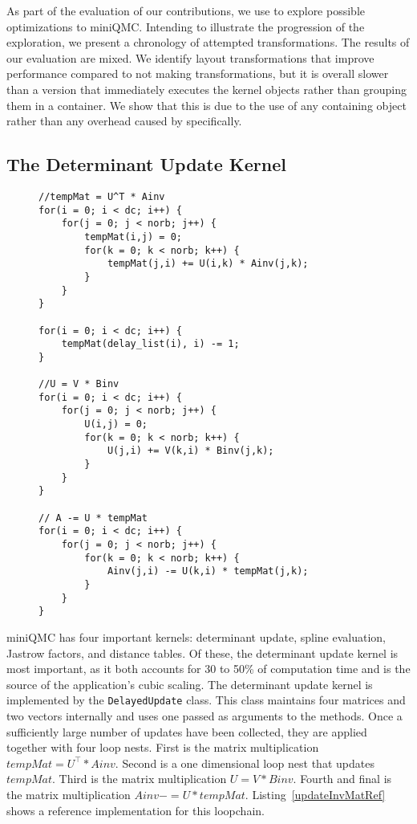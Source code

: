 As part of the evaluation of our contributions, we use \FormatDecisions{} to explore possible optimizations to miniQMC\@.
Intending to illustrate the progression of the exploration, we present a chronology of attempted transformations.
The results of our evaluation are mixed.
We identify layout transformations that improve performance compared to not making transformations, but it is overall slower than a version that immediately executes the kernel objects rather than grouping them in a container.
We show that this is due to the use of any containing object rather than any overhead caused by \FormatDecisions{} specifically.

\subsection{The Determinant Update Kernel}

\begin{figure}
\begin{lstlisting}[caption={Main loopchain of the determinant update kernel. Note that the access/storage order here is reversed.},label={updateInvMatRef}]
//tempMat = U^T * Ainv
for(i = 0; i < dc; i++) {
	for(j = 0; j < norb; j++) {
		tempMat(i,j) = 0;
		for(k = 0; k < norb; k++) {
			tempMat(j,i) += U(i,k) * Ainv(j,k);
		}
	}
}

for(i = 0; i < dc; i++) {
	tempMat(delay_list(i), i) -= 1;
}

//U = V * Binv
for(i = 0; i < dc; i++) {
	for(j = 0; j < norb; j++) {
		U(i,j) = 0;
		for(k = 0; k < norb; k++) {
			U(j,i) += V(k,i) * Binv(j,k);
		}
	}
}

// A -= U * tempMat
for(i = 0; i < dc; i++) {
	for(j = 0; j < norb; j++) {
		for(k = 0; k < norb; k++) {
			Ainv(j,i) -= U(k,i) * tempMat(j,k);
		}
	}
}
\end{lstlisting}
\end{figure}

miniQMC has four important kernels: determinant update, spline evaluation, Jastrow factors, and distance tables.
Of these, the determinant update kernel is most important, as it both accounts for 30 to 50\% of computation time and is the source of the application's cubic scaling.
The determinant update kernel is implemented by the \verb.DelayedUpdate. class.
This class maintains four matrices and two vectors internally and uses one passed as arguments to the methods. 
Once a sufficiently large number of updates have been collected, they are applied together with four loop nests.
First is the matrix multiplication $tempMat = U^{\top} * Ainv$.
Second is a one dimensional loop nest that updates $tempMat$.
Third is the matrix multiplication $U = V * Binv$.
Fourth and final is the matrix multiplication $Ainv -= U*tempMat$.
Listing~\ref{updateInvMatRef} shows a reference implementation for this loopchain.

